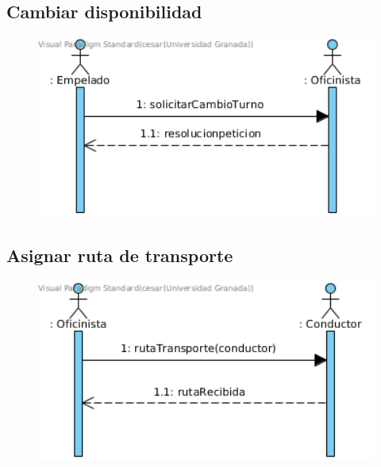 \subsection{Cambiar disponibilidad}
\begin{figure}[H]
	\centering
	\includegraphics[width=16cm]{4}
\end{figure}
\subsection{Asignar ruta de transporte}
\begin{figure}[H]
	\centering
	\includegraphics[width=16cm]{5}
\end{figure}
